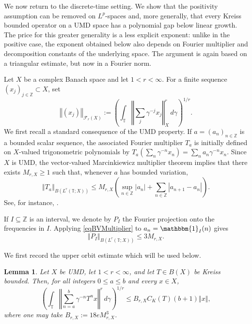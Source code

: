 \documentclass[12pt]{amsart}
\theoremstyle{plain}
\newtheorem{lemma}[thm]{Lemma}
\theoremstyle{remark}
\theoremstyle{definition}
\newcommand{\Z}{\mathbb{Z}}
\newcommand{\T}{\mathbb{T}}
\newcommand{\one}{\mathbbm{1}}
\newcommand{\norm}[1]{\left\Vert #1\right\Vert}
\begin{document}
	We now return to the discrete-time setting. We show that the positivity
	assumption can be removed on $L^p$-spaces and, more generally, that every
	Kreiss bounded operator on a UMD space has a polynomial gap below linear
	growth. The price for this greater generality is a less explicit exponent:
	unlike in the positive case, the exponent obtained below also depends on
	Fourier multiplier and decomposition constants of the underlying space.
	The argument is again based on a triangular estimate, but now in a Fourier
	norm.
	
	Let $X$ be a complex Banach space and let $1<r<\infty$. For a finite sequence
	$(x_j)_{j\in\Z}\subset X$, set
	\[
	\norm{(x_j)}_{\mathcal F_r(X)}
	:=
	\left(
	\int_{\T}\norm{\sum_j\gamma^{-j}x_j}_X^r\,d\gamma
	\right)^{1/r}.
	\]
	We first recall a standard consequence of the UMD property. If
	$a=(a_n)_{n\in\Z}$ is a bounded scalar sequence, the associated Fourier
	multiplier $T_a$ is initially defined on $X$-valued trigonometric polynomials
	by $T_a(\sum_n\gamma^{-n}x_n)=\sum_na_n\gamma^{-n}x_n$. Since $X$ is UMD, the
	vector-valued Marcinkiewicz multiplier theorem implies that there exists
	$M_{r,X}\ge1$ such that, whenever $a$ has bounded variation,
	\begin{equation}\label{eqBVMultiplier}
		\norm{T_a}_{B(L^r(\T;X))}
		\le
		M_{r,X}
		\left(
		\sup_{n\in\Z}|a_n|
		+
		\sum_{n\in\Z}|a_{n+1}-a_n|
		\right).
	\end{equation}
	See, for instance, \cite[Lemma 2.1]{DengLoristVeraar}.
	
	If $I\subseteq\Z$ is an interval, we denote by $P_I$ the Fourier projection
	onto the frequencies in $I$. Applying \eqref{eqBVMultiplier} to
	$a_n=\one_I(n)$ gives
	\begin{equation}\label{eqIntervalProjection}
		\norm{P_I}_{B(L^r(\T;X))}
		\le3M_{r,X}.
	\end{equation}
	
	We first record the upper orbit estimate which will be used below.
	
	\begin{lemma}\label{lemCunyBlock}
		Let $X$ be UMD, let $1<r<\infty$, and let $T\in B(X)$ be Kreiss bounded.
		Then, for all integers $0\le a\le b$ and every $x\in X$,
		\begin{equation}\label{eqCunyBlock}
			\left(
			\int_{\T}
			\norm{\sum_{n=a}^b\gamma^{-n}T^nx}^r\,d\gamma
			\right)^{1/r}
			\le
			B_{r,X}C_K(T)(b+1)\norm{x},
		\end{equation}
		where one may take $B_{r,X}:=18eM_{r,X}^3$.
	\end{lemma}
	
\end{document}

